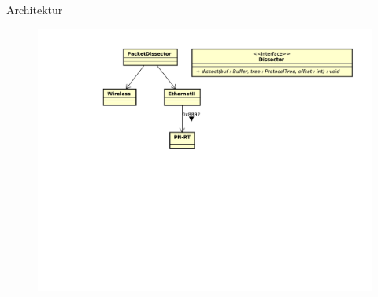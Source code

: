 \begin{frame}{Architektur}
    \begin{figure}
    	\centering
    	\includegraphics[width=\textwidth]{./images/dissector/4.pdf}
    \end{figure}
\end{frame}
